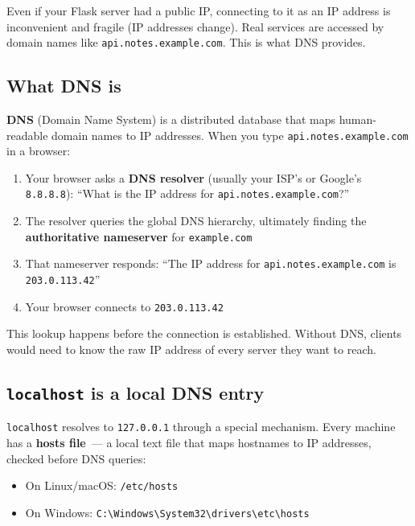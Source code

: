 Even if your Flask server had a public IP, connecting to it as an IP address is inconvenient and fragile (IP addresses change). Real services are accessed by domain names like \texttt{api.notes.example.com}. This is what DNS provides.

\subsection*{What DNS is}\label{10-networking-limitations:what-dns-is}

\textbf{DNS} (Domain Name System) is a distributed database that maps human-readable domain names to IP addresses. When you type \texttt{api.notes.example.com} in a browser:

\begin{enumerate}
\def\labelenumi{\arabic{enumi}.}
\tightlist
\item
  Your browser asks a \textbf{DNS resolver} (usually your ISP's or Google's \texttt{8.8.8.8}): ``What is the IP address for \texttt{api.notes.example.com}?''
\item
  The resolver queries the global DNS hierarchy, ultimately finding the \textbf{authoritative nameserver} for \texttt{example.com}
\item
  That nameserver responds: ``The IP address for \texttt{api.notes.example.com} is \texttt{203.0.113.42}''
\item
  Your browser connects to \texttt{203.0.113.42}
\end{enumerate}

\noindent{}This lookup happens before the connection is established. Without DNS, clients would need to know the raw IP address of every server they want to reach.

\subsection*{\texorpdfstring{\texttt{localhost} is a local DNS entry}{localhost is a local DNS entry}}\label{10-networking-limitations:localhost-is-a-local-dns-entry}

\texttt{localhost} resolves to \texttt{127.0.0.1} through a special mechanism. Every machine has a \textbf{hosts file}~--- a local text file that maps hostnames to IP addresses, checked before DNS queries:

\begin{itemize}
\tightlist
\item
  On Linux/macOS: \texttt{/etc/hosts}
\item
  On Windows: \texttt{C:}\allowbreak{}\texttt{\textbackslash{}Windows\textbackslash{}System32\textbackslash{}drivers\textbackslash{}etc\textbackslash{}hosts}
\end{itemize}


